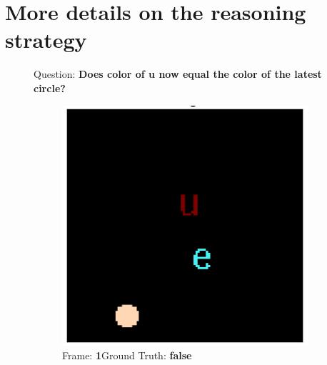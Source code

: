 \appendix

\section{More details on the reasoning strategy}
\label{sec:append}

\captionsetup[subfigure]{labelformat=empty}
\begin{figure}[htbp]
	\begin{center}
		Question: \textbf{Does color of u now equal the color of the latest circle?}
	\end{center}
	\vskip -0.4cm
	\null\hfill
	\begin{subfigure}{0.25\textwidth}
		\includegraphics[width=0.9\linewidth]{"../img/visualization/experiment_run_20190917_022319/Frame 1"}
		\caption{Frame: \textbf{1}\newline Ground Truth: \textbf{false}}
		\label{fig:frame-1}
	\end{subfigure}%
	\hfill
	\begin{subfigure}{0.25\textwidth}
		\centering

\end{subfigure}
\end{figure}
